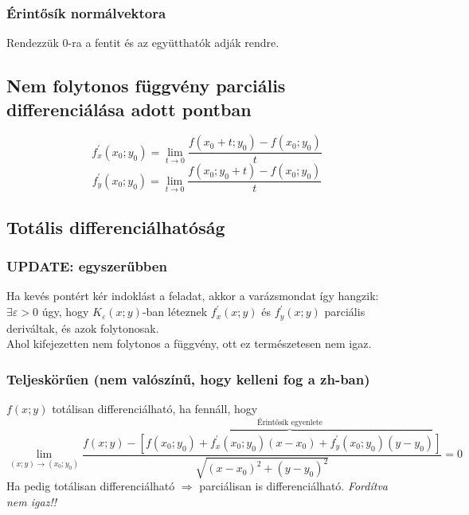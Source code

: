 \subsubsection*{Érintősík normálvektora}
Rendezzük 0-ra a fentit és az együtthatók adják rendre.

\subsection*{Nem folytonos függvény parciális differenciálása adott pontban}

\begin{equation}
  f^{'}_x(x_0;y_0) = \lim_{t \rightarrow 0} \frac{f(x_0+t;y_0) - f(x_0;y_0)}{t}
\end{equation}
\begin{equation}
  f^{'}_y(x_0;y_0) = \lim_{t \rightarrow 0} \frac{f(x_0;y_0+t) - f(x_0;y_0)}{t}
\end{equation}

\subsection*{Totális differenciálhatóság}

\subsubsection*{UPDATE: egyszerűbben}
Ha kevés pontért kér indoklást a feladat, akkor a varázsmondat így hangzik: $\exists \varepsilon > 0$ úgy, hogy $K_{\varepsilon}(x;y)$-ban léteznek $f^ {'}_x(x;y)$ és $f^{'}_y(x;y)$ parciális deriváltak, és azok folytonosak. \\
Ahol kifejezetten nem folytonos a függvény, ott ez természetesen nem igaz.%

\subsubsection*{Teljeskörűen (nem valószínű, hogy kelleni fog a zh-ban)}

$f(x;y)$ totálisan differenciálható, ha fennáll, hogy
\begin{equation}
  \lim_{(x;y) \rightarrow (x_0;y_0)} \frac{f(x;y) - \overbrace{\left[ f(x_0;y_0) + f^{'}_x(x_0;y_0)(x-x_0) + f^{'}_y(x_0;y_0)(y-y_0)  \right]}^{\text{Érintősík egyenlete}}}{\sqrt{(x-x_0)^2 + (y-y_0)^2}} = 0
\end{equation}
Ha pedig totálisan differenciálható $\Rightarrow$ parciálisan is differenciálható. \emph{Fordítva nem igaz!!}

